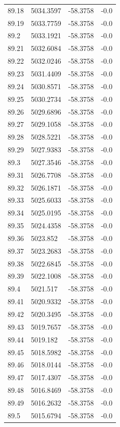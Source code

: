 \begin{table}[H]
\begin{tabular}{llll}
89.18 & 5034.3597 & -58.3758 & -0.0 \\
89.19 & 5033.7759 & -58.3758 & -0.0 \\
89.2 & 5033.1921 & -58.3758 & -0.0 \\
89.21 & 5032.6084 & -58.3758 & -0.0 \\
89.22 & 5032.0246 & -58.3758 & -0.0 \\
89.23 & 5031.4409 & -58.3758 & -0.0 \\
89.24 & 5030.8571 & -58.3758 & -0.0 \\
89.25 & 5030.2734 & -58.3758 & -0.0 \\
89.26 & 5029.6896 & -58.3758 & -0.0 \\
89.27 & 5029.1058 & -58.3758 & -0.0 \\
89.28 & 5028.5221 & -58.3758 & -0.0 \\
89.29 & 5027.9383 & -58.3758 & -0.0 \\
89.3 & 5027.3546 & -58.3758 & -0.0 \\
89.31 & 5026.7708 & -58.3758 & -0.0 \\
89.32 & 5026.1871 & -58.3758 & -0.0 \\
89.33 & 5025.6033 & -58.3758 & -0.0 \\
89.34 & 5025.0195 & -58.3758 & -0.0 \\
89.35 & 5024.4358 & -58.3758 & -0.0 \\
89.36 & 5023.852 & -58.3758 & -0.0 \\
89.37 & 5023.2683 & -58.3758 & -0.0 \\
89.38 & 5022.6845 & -58.3758 & -0.0 \\
89.39 & 5022.1008 & -58.3758 & -0.0 \\
89.4 & 5021.517 & -58.3758 & -0.0 \\
89.41 & 5020.9332 & -58.3758 & -0.0 \\
89.42 & 5020.3495 & -58.3758 & -0.0 \\
89.43 & 5019.7657 & -58.3758 & -0.0 \\
89.44 & 5019.182 & -58.3758 & -0.0 \\
89.45 & 5018.5982 & -58.3758 & -0.0 \\
89.46 & 5018.0144 & -58.3758 & -0.0 \\
89.47 & 5017.4307 & -58.3758 & -0.0 \\
89.48 & 5016.8469 & -58.3758 & -0.0 \\
89.49 & 5016.2632 & -58.3758 & -0.0 \\
89.5 & 5015.6794 & -58.3758 & -0.0 \\

\end{tabular}
\end{table}
